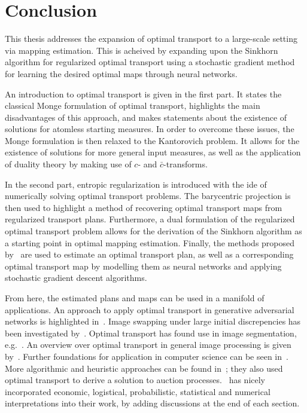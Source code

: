 \chapter*{Conclusion}

This thesis addresses the expansion of optimal transport to a large-scale setting via mapping estimation. This is acheived by expanding upon the Sinkhorn algorithm for regularized optimal transport using a stochastic gradient method for learning the desired optimal maps through neural networks.

An introduction to optimal transport is given in the first part. It states the classical Monge formulation of optimal transport, highlights the main disadvantages of this approach, and makes statements about the existence of solutions for atomless starting measures. In order to overcome these issues, the Monge formulation is then relaxed to the Kantorovich problem. It allows for the existence of solutions for more general input measures, as well as the application of duality theory by making use of $c$- and $\bar{c}$-transforms.

In the second part, entropic regularization is introduced with the ide of numerically solving optimal transport problems. The barycentric projection is then used to highlight a method of recovering optimal transport maps from regularized transport plans. Furthermore, a dual formulation of the regularized optimal transport problem allows for the derivation of the Sinkhorn algorithm as a starting point in optimal mapping estimation. Finally, the methods proposed by\ \cite{Seg2018} are used to estimate an optimal transport plan, as well as a corresponding optimal transport map by modelling them as neural networks and applying stochastic gradient descent algorithms.

From here, the estimated plans and maps can be used in a manifold of applications. An approach to apply optimal transport in generative adversarial networks is highlighted in\ \cite{Sal2018}. Image swapping under large initial discrepencies has been investigated by\ \cite{Zhu2020}. Optimal transport has found use in image segmentation, e.g.\ \cite{Rabin2015}. An overview over optimal transport in general image processing is given by\ \cite{Papa2015}. Further foundations for application in computer science can be seen in\ \cite{Levy2017}. More algorithmic and heuristic approaches can be found in~\cite{Pey2019}; they also used optimal transport to derive a solution to auction processes.\ \cite{San2015} has nicely incorporated economic, logistical, probabilistic, statistical and numerical interpretations into their work, by adding discussions at the end of each section.


